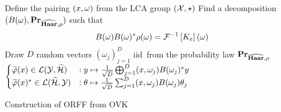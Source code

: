 \begin{center}
    \begin{algorithm2e}[H]\label{alg:ORFF_construction}
        \SetAlgoLined
        \BlankLine
        Define the pairing $(x, \omega)$ from the \acs{LCA} group
        $(\mathcal{X}, \star)$\; Find a decomposition
        $(B(\omega),{\mathbf{{Pr}}}_{\widehat{\mathbf{Haar}},\rho})$ such that
        \begin{dmath*}
            B(\omega)B(\omega)^\adjoint \rho(\omega)=\IFT{K_e}(\omega)\text{\;}
        \end{dmath*}
        \nl Draw $D$ random vectors $(\omega_j)_{j=1}^D$ \ac{iid}~from the
        probability law ${\mathbf{{Pr}}}_{\widehat{\mathbf{Haar}},\rho}$\;
        \nl \Return
        $\begin{cases}
            \tildePhi{\omega}(x) \in \mathcal{L}(\mathcal{Y}, \tildeH{\omega})
            &: y \mapsto \frac{1}{\sqrt{D}}\Vect_{j=1}^D\pairing{x,
            \omega_j}B(\omega_j)^\adjoint y \\ 
            \tildePhi{\omega}(x)^\adjoint \in\mathcal{L}(\tildeH{\omega},
            \mathcal{Y}) &: \theta \mapsto \frac{1}{\sqrt{D}} \sum_{j=1}^D
            \pairing{x, \omega_j}B(\omega_j)\theta_j 
        \end{cases}$\;
        \caption{Construction of \acs{ORFF} from \acs{OVK}}
    \end{algorithm2e}
\end{center}


